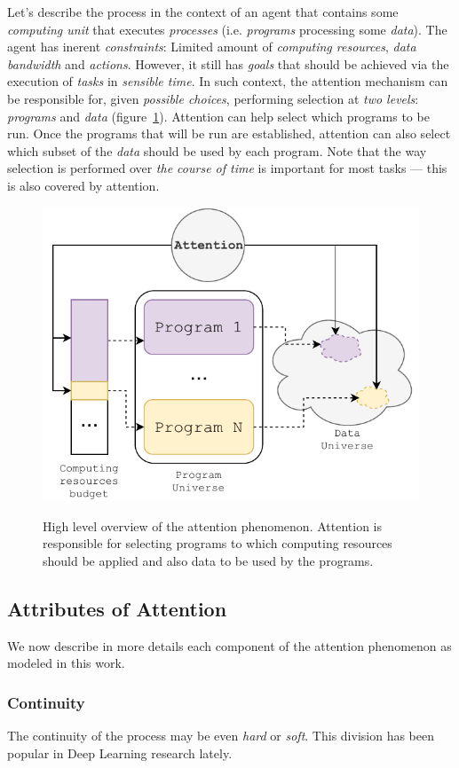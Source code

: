 \documentclass[11pt]{article}
\begin{document}
Let's describe the process in the context of an agent that
contains some \emph{computing unit} that executes \emph{processes}
(i.e. \emph{programs} processing some \emph{data}).
The agent has inerent \emph{constraints}:
Limited amount of \emph{computing resources}, \emph{data bandwidth} and \emph{actions}.
However, it still has \emph{goals} that should be achieved via the execution of \emph{tasks}
in \emph{sensible time}.
In such context, the attention mechanism can be responsible for, given \emph{possible choices},
performing selection at \emph{two levels}: \emph{programs} and \emph{data} (figure~\ref{fig:mind}).
Attention can help select which programs to be run.
Once the programs that will be run are established, attention can also
select which subset of the \emph{data} should be used by each program.
Note that the way selection is performed over \emph{the course of time} is important for most tasks ---
this is also covered by attention.

\begin{figure}[H]
    \centering
    \includegraphics[width=0.7\linewidth]{./img/mind.pdf}\label{fig:mind}
    \caption{High level overview of the attention phenomenon. Attention is responsible for selecting programs to which computing resources should be applied and also data to be used by the programs.}
\end{figure}

\subsection{Attributes of Attention}
We now describe in more details each component of the attention phenomenon
as modeled in this work.

\subsubsection{Continuity}\label{sec:attrs-continuity}
The continuity of the process may be even \emph{hard} or \emph{soft}.
This division has been popular in Deep Learning research lately.
\end{document}
